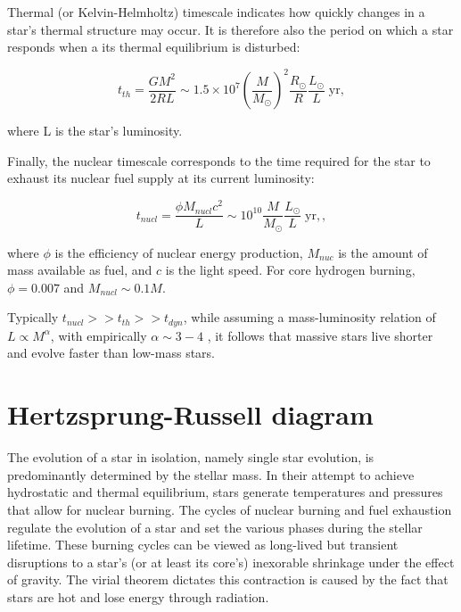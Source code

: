 Thermal (or Kelvin-Helmholtz) timescale indicates how quickly changes in a star's thermal structure may occur. It is therefore also the period on which a star responds when a its thermal equilibrium is disturbed:

\begin{equation}
    t_{th} = \frac{G M^2}{2RL} \sim 1.5 \times 10^7 \left( \frac{M}{M_{\odot}} \right)^{2} \frac{R_{\odot}}{R} \frac{L_{\odot}}{L} \; \text{yr},
\end{equation}\label{eq:thermal_timsecale}

where L is the star's luminosity.

Finally, the nuclear timescale corresponds to the time required for the star to exhaust its nuclear fuel supply at its current luminosity: 

\begin{equation}
    t_{nucl} = \frac{\phi M_{nucl} c^2}{L} \sim 10^{10} \frac{M}{M_{\odot}} \frac{L_{\odot}}{L} \; \text{yr},,
\end{equation}\label{eq:nuclear_timsecale}

where $\phi$ is the efficiency of nuclear energy production, $M_{nuc}$ is the amount of mass available as fuel, and $c$ is the light speed. For core hydrogen burning, $\phi = 0.007$ and $M_{nucl} \sim 0.1 M$.

Typically $t_{nucl} >> t_{th} >> t_{dyn}$, while assuming a mass-luminosity relation of $L \propto M^{\alpha}$, with empirically $\alpha \sim 3-4$ \citep{eker2015main}, it follows that massive stars live shorter and evolve faster than low-mass stars.

\section{Hertzsprung-Russell diagram}

The evolution of a star in isolation, namely single star evolution, is predominantly determined by the stellar mass. In their attempt to achieve hydrostatic and thermal equilibrium, stars generate temperatures and pressures that allow for nuclear burning. The cycles of nuclear burning and fuel exhaustion regulate the evolution of a star and set the various phases during the stellar lifetime. These burning cycles can be viewed as long-lived but transient disruptions to a star's (or at least its core's) inexorable shrinkage under the effect of gravity. The virial theorem dictates this contraction is caused by the fact that stars are hot and lose energy through radiation. 

